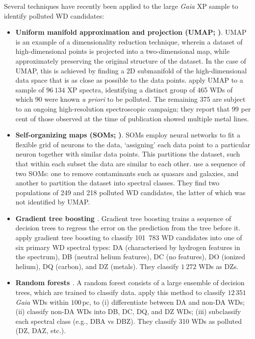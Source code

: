 \documentclass[fleqn,usenatbib]{rasti}
\begin{document}
Several techniques have recently been applied to the large \textit{Gaia} XP sample to identify polluted WD candidates:
\begin{itemize}
\item \textbf{Uniform manifold approximation and projection (UMAP; \citealt{mcinnes18})}.
UMAP is an example of a dimensionality reduction technique, wherein a dataset of high-dimensional points is projected into a two-dimensional map, while approximately preserving the original structure of the dataset.
In the case of UMAP, this is achieved by finding a 2D submanifold of the high-dimensional data space that is as close as possible to the data points. 
\citet{kao24} apply UMAP to a sample of $96~134$ XP spectra, identifying a distinct group of 465 WDs of which 90 were known \textit{a priori} to be polluted.
The remaining 375 are subject to an ongoing high-resolution spectroscopic campaign; they report that 99 per cent of those observed at the time of publication showed multiple metal lines.
\item \textbf{Self-organizing maps (SOMs; \citealt{kohonen82})}.
SOMs employ neural networks to fit a flexible grid of neurons to the data, `assigning' each data point to a particular neuron together with similar data points.
This partitions the dataset, such that within each subset the data are similar to each other.
\citet{perezcouto24} use a sequence of two SOMs: one to remove contaminants such as quasars and galaxies, and another to partition the dataset into spectral classes.
They find two populations of 249 and 218 polluted WD candidates, the latter of which was not identified by UMAP.
\item \textbf{Gradient tree boosting \citep{friedman01}}.
Gradient tree boosting trains a sequence of decision trees to regress the error on the prediction from the tree before it.
\citet{vincent24} apply gradient tree boosting to classify 101~783 WD candidates into one of six primary WD spectral types:
DA (characterised by hydrogen features in the spectrum),
DB (neutral helium features),
DC (no features),
DO (ionized helium),
DQ (carbon),
and DZ (metals).
They classify $1~272$ WDs as DZs.
\item \textbf{Random forests \citep{breiman01}}.
A random forest consists of a large ensemble of decision trees, which are trained to classify data.
\citet{garciazamora23} apply this method to classify $12\,351$ \textit{Gaia} WDs within $100\,\text{pc}$, to (i) differentiate between DA and non-DA WDs; (ii) classify non-DA WDs into DB, DC, DQ, and DZ WDs; (iii) subclassify each spectral class (e.g., DBA vs DBZ).
They classify 310 WDs as polluted (DZ, DAZ, etc.).
\end{itemize}
\end{document}
